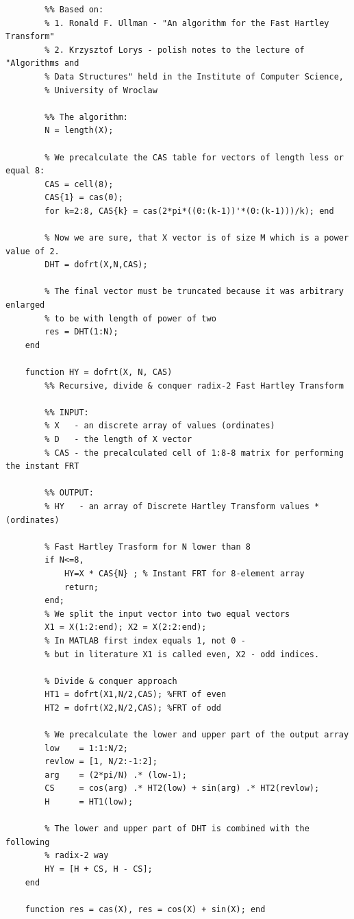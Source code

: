 \documentclass[12pt,twoside,a4paper]{article}
\numberwithin{equation}{subsection}
\numberwithin{figure}{subsection}
\begin{document}
\begin{lstlisting}
	    %% Based on:
	    % 1. Ronald F. Ullman - "An algorithm for the Fast Hartley Transform"
	    % 2. Krzysztof Lorys - polish notes to the lecture of "Algorithms and
	    % Data Structures" held in the Institute of Computer Science,
	    % University of Wroclaw
	  
	    %% The algorithm:
	    N = length(X);
	    
	    % We precalculate the CAS table for vectors of length less or equal 8:
	    CAS = cell(8);
	    CAS{1} = cas(0);
	    for k=2:8, CAS{k} = cas(2*pi*((0:(k-1))'*(0:(k-1)))/k); end
	    
	    % Now we are sure, that X vector is of size M which is a power value of 2.
	    DHT = dofrt(X,N,CAS);
	    
	    % The final vector must be truncated because it was arbitrary enlarged
	    % to be with length of power of two
	    res = DHT(1:N);
	end
	
	function HY = dofrt(X, N, CAS)
	    %% Recursive, divide & conquer radix-2 Fast Hartley Transform
	    
	    %% INPUT:
	    % X   - an discrete array of values (ordinates)
	    % D   - the length of X vector
	    % CAS - the precalculated cell of 1:8-8 matrix for performing the instant FRT
	    
	    %% OUTPUT:
	    % HY   - an array of Discrete Hartley Transform values * (ordinates)
	    
	    % Fast Hartley Trasform for N lower than 8
	    if N<=8, 
	        HY=X * CAS{N} ; % Instant FRT for 8-element array
	        return;
	    end;
	    % We split the input vector into two equal vectors
	    X1 = X(1:2:end); X2 = X(2:2:end); 
	    % In MATLAB first index equals 1, not 0 - 
	    % but in literature X1 is called even, X2 - odd indices.
	    
	    % Divide & conquer approach
	    HT1 = dofrt(X1,N/2,CAS); %FRT of even
	    HT2 = dofrt(X2,N/2,CAS); %FRT of odd
	    
	    % We precalculate the lower and upper part of the output array 
	    low    = 1:1:N/2;
	    revlow = [1, N/2:-1:2];
	    arg    = (2*pi/N) .* (low-1);
	    CS     = cos(arg) .* HT2(low) + sin(arg) .* HT2(revlow);
	    H      = HT1(low);
	    
	    % The lower and upper part of DHT is combined with the following
	    % radix-2 way
	    HY = [H + CS, H - CS];
	end
	
	function res = cas(X), res = cos(X) + sin(X); end
\end{lstlisting}
\end{document}
